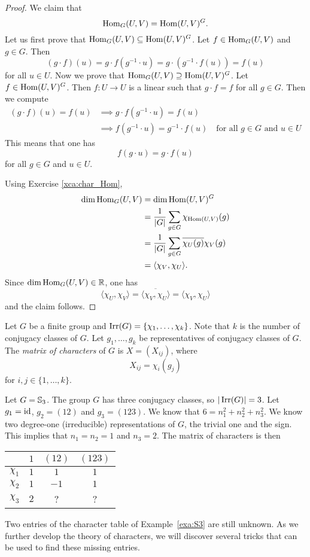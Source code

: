 \begin{proof}
    We claim that 
    \[
    \operatorname{Hom}_G(U,V)=\operatorname{Hom}(U,V)^G.
    \]
    Let us first prove that
    $\operatorname{Hom}_G(U,V)\subseteq\operatorname{Hom}(U,V)^G$. Let $f\in \operatorname{Hom}_G(U,V)$ and 
    $g\in G$. Then
    \[
    (g\cdot f)(u)=g\cdot f(g^{-1}\cdot u)=g\cdot (g^{-1}\cdot f(u))=f(u)
    \]
    for all $u\in U$. Now we prove that $\operatorname{Hom}_G(U,V)\supseteq\operatorname{Hom}(U,V)^G$.
    Let $f\in\operatorname{Hom}(U,V)^G$. Then $f\colon U\to U$ is a linear such that
    $g\cdot f=f$ for all $g\in G$. Then
    we compute 
    \begin{align*}
    (g\cdot f)(u)=f(u)&\implies 
    g\cdot f(g^{-1}\cdot u)=f(u)\\
    &\implies f(g^{-1}\cdot u)=g^{-1}\cdot f(u)\quad 
    \text{for all $g\in G$ and $u\in U$}
    \end{align*}
    This means that one has 
    \[
    f(g\cdot u)=g\cdot f(u)
    \]
    for all $g\in G$ and $u\in U$. 
    
    Using Exercise \ref{xca:char_Hom}, 
    \begin{align*}
        \dim\operatorname{Hom}_G(U,V) &= \dim\operatorname{Hom}(U,V)^G\\
        &=\frac{1}{|G|}\sum_{g\in G}\chi_{\operatorname{Hom}(U,V)}(g)\\
        &=\frac{1}{|G|}\sum_{g\in G}\overline{\chi_U(g)}\chi_V(g)\\
        &=\langle \chi_V,\chi_U\rangle.
    \end{align*}
    Since $\dim\operatorname{Hom}_G(U,V)\in\mathbb{R}$, one has    
    \[
\langle\chi_U,\chi_V\rangle=\overline{\langle\chi_V,\chi_U\rangle}=\langle\chi_V,\chi_U\rangle
    \]
    and the claim follows. 
\end{proof}

Let $G$ be a finite group and $\operatorname{Irr}(G)=\{\chi_1,\dots,\chi_k\}$. 
Note that $k$ is the number of conjugacy classes of $G$. Let 
$g_1,\dots,g_k$ be representatives of conjugacy classes of $G$. 
The \emph{matrix of characters} of $G$ 
is $X=(X_{ij})$, where 
\[
X_{ij}=\chi_i(g_j)
\]
for $i,j\in\{1,\dots,k\}$. 

\begin{example}
\label{exa:S3}
    Let $G=\mathbb{S}_3$. The group $G$ has three conjugacy classes, so
    $|\operatorname{Irr}(G)|=3$. Let $g_1=\operatorname{id}$, $g_2=(12)$ and $g_3=(123)$. We 
    know that $6=n_1^2+n_2^2+n_3^2$. We know two degree-one
    (irreducible) representations of $G$, the trivial one and
    the sign. This implies that $n_1=n_2=1$ and 
    $n_3=2$. 
    The matrix of characters is then
    \begin{center}
		\begin{tabular}{|c|ccc|}
			\hline
			& $1$ & $(12)$ & $(123)$ \tabularnewline
			\hline 
			$\chi_{1}$ & $1$ & $1$ & $1$\tabularnewline
			$\chi_{2}$ & $1$ & $-1$ & $1$ \tabularnewline
			$\chi_{3}$ & $2$ & ? & ? \tabularnewline
			\hline
		\end{tabular}
	\end{center}
\end{example}

Two entries of the character table of Example~\ref{exa:S3} 
are still unknown. As we further develop the theory of characters, we will discover several tricks that can be used to find these missing entries.
